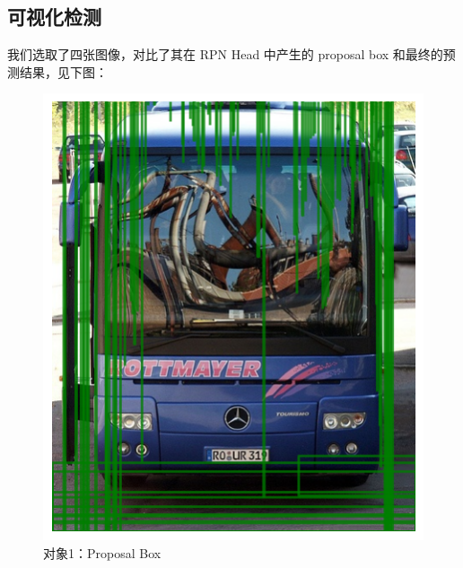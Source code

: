 \documentclass[notitlepage,cs4size,punct,oneside]{ctexrep}
\numberwithin{equation}{chapter}
\theoremstyle{mystyle}
\begin{document}
\subsection{可视化检测}
我们选取了四张图像，对比了其在 RPN Head 中产生的 proposal box 和最终的预测结果，见下图：
\begin{figure}[!htpb]
    \centering
    \begin{minipage}[t]{0.49\textwidth}
    \includegraphics[width=\linewidth]{1ppbox.png}
    \caption{对象1：Proposal Box}
    \label{mAPfrcnn}
    \end{minipage}
    \begin{minipage}[t]{0.49\textwidth}

\end{minipage}
\end{figure}
\end{document}
